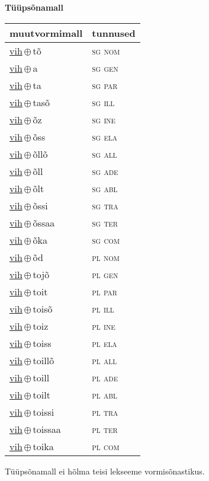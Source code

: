 

\vspace{3.5em}
\noindent \begin{minipage}{\textwidth}
\noindent \textbf{Tüüpsõnamall \,}\\

\begin{sideways}
\begin{tabular}{l l}
muutvormimall & tunnused \\
\hline
\underline{vih}\,$\oplus$\,tõ & \textsc{ sg nom } \\
\underline{vih}\,$\oplus$\,a & \textsc{ sg gen } \\
\underline{vih}\,$\oplus$\,ta & \textsc{ sg par } \\
\underline{vih}\,$\oplus$\,tasõ & \textsc{ sg ill } \\
\underline{vih}\,$\oplus$\,õz & \textsc{ sg ine } \\
\underline{vih}\,$\oplus$\,õss & \textsc{ sg ela } \\
\underline{vih}\,$\oplus$\,õllõ & \textsc{ sg all } \\
\underline{vih}\,$\oplus$\,õll & \textsc{ sg ade } \\
\underline{vih}\,$\oplus$\,õlt & \textsc{ sg abl } \\
\underline{vih}\,$\oplus$\,õssi & \textsc{ sg tra } \\
\underline{vih}\,$\oplus$\,õssaa & \textsc{ sg ter } \\
\underline{vih}\,$\oplus$\,õka & \textsc{ sg com } \\
\underline{vih}\,$\oplus$\,õd & \textsc{ pl nom } \\
\underline{vih}\,$\oplus$\,tojõ & \textsc{ pl gen } \\
\underline{vih}\,$\oplus$\,toit & \textsc{ pl par } \\
\underline{vih}\,$\oplus$\,toisõ & \textsc{ pl ill } \\
\underline{vih}\,$\oplus$\,toiz & \textsc{ pl ine } \\
\underline{vih}\,$\oplus$\,toiss & \textsc{ pl ela } \\
\underline{vih}\,$\oplus$\,toillõ & \textsc{ pl all } \\
\underline{vih}\,$\oplus$\,toill & \textsc{ pl ade } \\
\underline{vih}\,$\oplus$\,toilt & \textsc{ pl abl } \\
\underline{vih}\,$\oplus$\,toissi & \textsc{ pl tra } \\
\underline{vih}\,$\oplus$\,toissaa & \textsc{ pl ter } \\
\underline{vih}\,$\oplus$\,toika & \textsc{ pl com } \\
\end{tabular}
\end{sideways}
\label{tab:tüüpsõnamall-vihtõ}

\end{minipage}

 
\vspace{1em}
\noindent Tüüpsõnamall  ei hõlma teisi lekseeme vormi\-sõnastikus.
